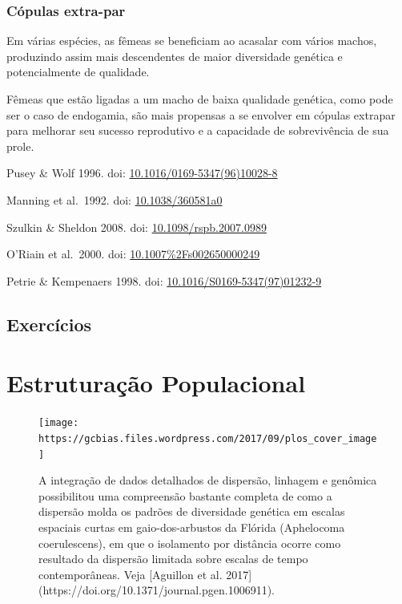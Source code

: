 \documentclass[
]{book}
\begin{document}
\hypertarget{cuxf3pulas-extra-par}{%
\subsection{Cópulas extra-par}\label{cuxf3pulas-extra-par}}

Em várias espécies, as fêmeas se beneficiam ao acasalar com vários machos, produzindo assim mais descendentes de maior diversidade genética e potencialmente de qualidade.

Fêmeas que estão ligadas a um macho de baixa qualidade genética, como pode ser o caso de endogamia, são mais propensas a se envolver em cópulas extrapar para melhorar seu sucesso reprodutivo e a capacidade de sobrevivência de sua prole.

Pusey \& Wolf 1996. doi: \href{http://dx.doi.org/10.1016/0169-5347(96)10028-8}{10.1016/0169-5347(96)10028-8}

Manning et al.~1992. doi: \href{https://doi.org/10.1038/360581a0}{10.1038/360581a0}

Szulkin \& Sheldon 2008. doi: \href{http://dx.doi.org/10.1098/rspb.2007.0989}{10.1098/rspb.2007.0989}

O'Riain et al.~2000. doi: \href{https://doi.org/10.1007\%2Fs002650000249}{10.1007\%2Fs002650000249}

Petrie \& Kempenaers 1998. doi: \href{https://doi.org/10.1016/S0169-5347(97)01232-9}{10.1016/S0169-5347(97)01232-9}

\hypertarget{exercuxedcios-2}{%
\section{Exercícios}\label{exercuxedcios-2}}

\hypertarget{estruturauxe7uxe3o-populacional}{%
\chapter{Estruturação Populacional}\label{estruturauxe7uxe3o-populacional}}

\begin{figure}

{\centering \texttt{[image: https://gcbias.files.wordpress.com/2017/09/plos\_cover\_image]} 

}

\caption{A integração de dados detalhados de dispersão, linhagem e genômica possibilitou uma compreensão bastante completa de como a dispersão molda os padrões de diversidade genética em escalas espaciais curtas em gaio-dos-arbustos da Flórida (Aphelocoma coerulescens), em que o isolamento por distância ocorre como resultado da dispersão limitada sobre escalas de tempo contemporâneas. Veja [Aguillon et al. 2017](https://doi.org/10.1371/journal.pgen.1006911).}\label{fig:Aphelocoma}
\end{figure}
\end{document}

